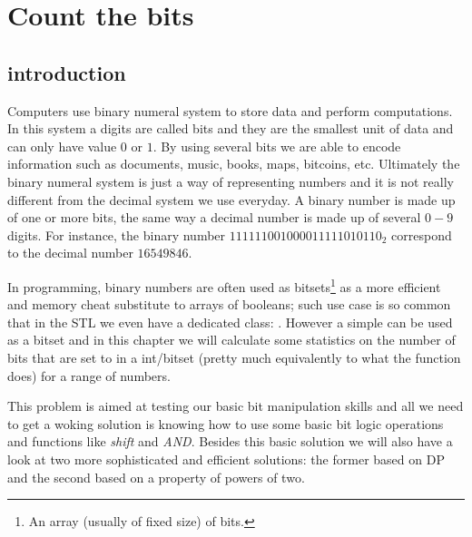 %



\chapter{Count the bits}
\label{ch:count_bits}

\section*{introduction}
Computers use binary numeral system to store data and perform computations. In this system a digits are called bits and they are the smallest unit of data and can only have value $0$ or $1$.
By using several bits we are able to encode information such as documents,  music, books, maps, bitcoins, etc. Ultimately the binary numeral system is just a way of representing numbers and it is not really different from the decimal system we use everyday.
A binary number is made up of one or more bits, the same way a decimal number is made up of several $0-9$ digits. For instance, the binary number $111111001000011111010110_2$ correspond to the decimal number $16549846$.

In programming, binary numbers are often used as bitsets\footnote{An array (usually of fixed size) of bits.} as a more efficient and memory cheat substitute to arrays of booleans; such use case is so common that in the \CC STL we even have a dedicated class: \href{https://en.cppreference.com/w/cpp/utility/bitset}{}. However a simple  can be used as a bitset and in this chapter we will calculate some statistics on the number of bits that are set to  in a int/bitset (pretty much equivalently to what the function \href{https://en.cppreference.com/w/cpp/numeric/popcount}{} does) for a range of numbers.

This problem is aimed at testing our basic bit manipulation skills and all we need to get a woking solution is knowing how to use some basic bit logic operations and functions like \textit{shift} and  \textit{AND}. Besides this basic solution we will also have a look at two more sophisticated and efficient solutions: the former based on DP and the second based on a property of powers of two. 



